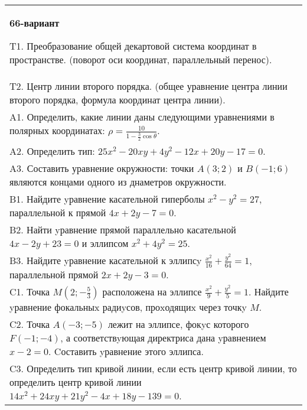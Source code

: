 \documentclass{article}
\begin{document}
\begin{tabular}{m{17cm}}
\textbf{66-вариант}
\newline

T1. Преобразование общей декартовой система координат в пространстве. (поворот оси координат, параллельный перенос).\\

T2. Центр линии второго порядка. (общее уравнение центра линии второго порядка, формула координат центра линии).\\

A1. Определить, какие линии даны следующими уравнениями в полярных координатах: $\rho=\frac{10}{1-\frac{3}{2}\cos\theta}$.\\

A2. Определить тип: $25x^{2}-20xy+4y^{2}-12x+20y-17=0$.\\

A3. Составить уравнение окружности: точки $A(3;2)$ и $B(-1;6)$ являются концами одного из днаметров окружности.\\

B1. Найдите yравнение касательной гиперболы $x^{2} - y^{2} = 27$, параллельной к прямой $4x + 2y - 7 = 0$.  \\

B2. Найти yравнение прямой параллельно касательной $4x - 2y + 23 = 0$ и эллипсом $x^{2} + 4y^{2} = 25$.  \\

B3. Найдите yравнение касательной к эллипсy $\frac{x^{2}}{16} + \frac{y^{2}}{64} = 1$, параллельной прямой $2x + 2y - 3 = 0$.  \\

C1. Точка $M(2;-\frac{5}{3})$ расположена на эллипсе $\frac{x^{2}}{9}+\frac{y^{2}}{5}=1$. Найдите yравнение фокальныx радиyсов, проxодящиx через точкy $M$.  \\

C2. Точка $A(-3;-5)$ лежит на эллипсе, фокyс которого $F(-1;-4)$, а соответствyющая директриса дана yравнением $x-2=0$. Cоставить yравнение этого эллипса.  \\

C3. Определить тип кривой линии, если есть центр кривой линии, то определить центр кривой линии $14x^{2}+24xy+21y^{2}-4x+18y-139=0$.  \\

\end{tabular}
\vspace{1cm}
\end{document}

